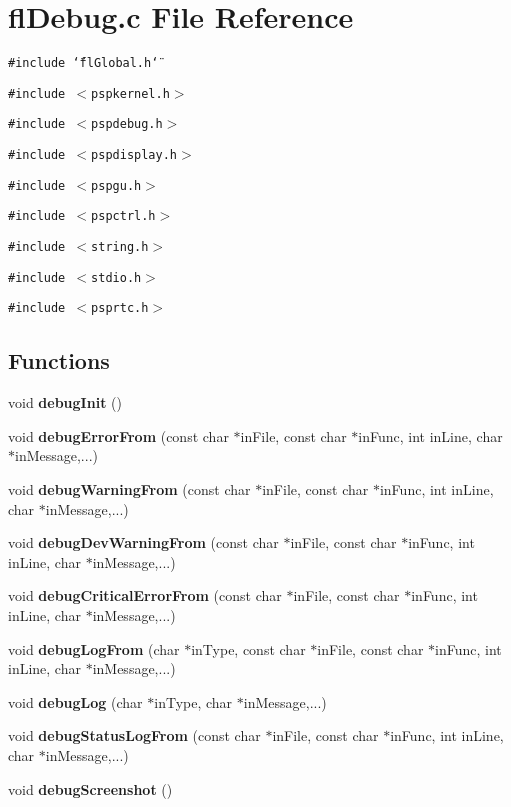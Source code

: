 \section{fl\-Debug.c File Reference}
\label{flDebug_8c}
{\tt \#include \char`\"{}fl\-Global.h\char`\"{}}\par
{\tt \#include $<$pspkernel.h$>$}\par
{\tt \#include $<$pspdebug.h$>$}\par
{\tt \#include $<$pspdisplay.h$>$}\par
{\tt \#include $<$pspgu.h$>$}\par
{\tt \#include $<$pspctrl.h$>$}\par
{\tt \#include $<$string.h$>$}\par
{\tt \#include $<$stdio.h$>$}\par
{\tt \#include $<$psprtc.h$>$}\par
\subsection*{Functions}
\begin{CompactItemize}
\item 
void {\bf debug\-Init} ()
\item 
void {\bf debug\-Error\-From} (const char $\ast$in\-File, const char $\ast$in\-Func, int in\-Line, char $\ast$in\-Message,...)
\item 
void {\bf debug\-Warning\-From} (const char $\ast$in\-File, const char $\ast$in\-Func, int in\-Line, char $\ast$in\-Message,...)
\item 
void {\bf debug\-Dev\-Warning\-From} (const char $\ast$in\-File, const char $\ast$in\-Func, int in\-Line, char $\ast$in\-Message,...)
\item 
void {\bf debug\-Critical\-Error\-From} (const char $\ast$in\-File, const char $\ast$in\-Func, int in\-Line, char $\ast$in\-Message,...)
\item 
void {\bf debug\-Log\-From} (char $\ast$in\-Type, const char $\ast$in\-File, const char $\ast$in\-Func, int in\-Line, char $\ast$in\-Message,...)
\item 
void {\bf debug\-Log} (char $\ast$in\-Type, char $\ast$in\-Message,...)
\item 
void {\bf debug\-Status\-Log\-From} (const char $\ast$in\-File, const char $\ast$in\-Func, int in\-Line, char $\ast$in\-Message,...)
\item 
void {\bf debug\-Screenshot} ()
\end{CompactItemize}
